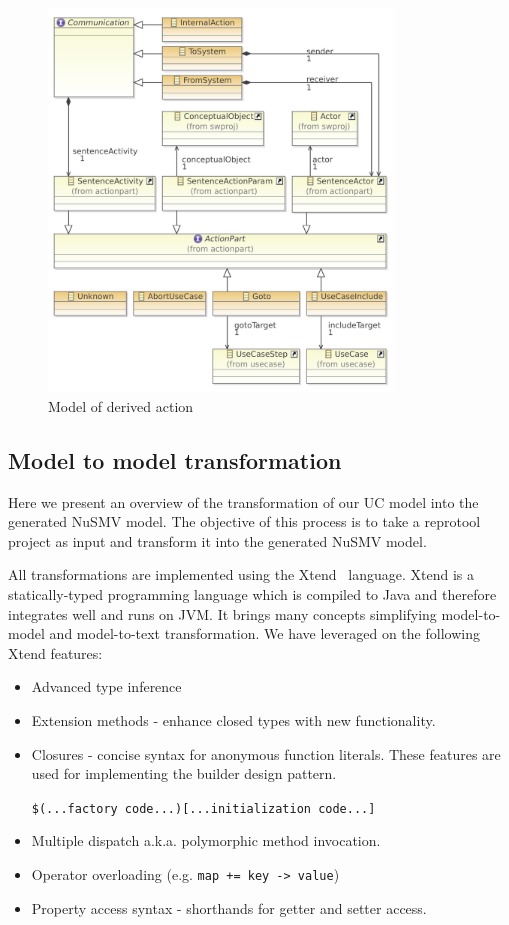 \begin{figure}[ht]
  \centering
  \includegraphics[width=260pt]{images/ReprotoolActionsModel}
  \caption{Model of derived action}
  \label{fig:ReprotoolActionsModel_}
\end{figure}

\subsection{Model to model transformation}

Here we present an overview of the transformation of our UC model into the generated NuSMV model. The objective of this process is to take a reprotool project as input and transform it into the generated NuSMV model.

All transformations are implemented using the Xtend~\cite{Xtend-website} language.
Xtend is a statically-typed programming language which is compiled to Java and therefore integrates well and runs on JVM. It brings many concepts simplifying model-to-model and model-to-text transformation. We have leveraged on the following Xtend features: 
\begin{itemize}
	\item Advanced type inference
	\item Extension methods - enhance closed types with new functionality.
	\item Closures - concise syntax for anonymous function literals.
		These features are used for implementing the builder design pattern.
	
		\verb|$(...factory code...)[...initialization code...]|
	
	\item Multiple dispatch a.k.a. polymorphic method invocation.
	\item Operator overloading (e.g. \verb|map += key -> value|)
	\item Property access syntax - shorthands for getter and setter access.
\end{itemize}

